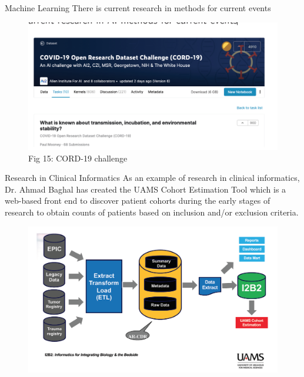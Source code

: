 \documentclass{beamer}
\begin{document}
	\begin{frame}{Machine Learning}
		There is current research in methods for current events
		\begin{figure}[h]
			\centering
			\includegraphics[scale=0.45]{Figures/covid.png}
			\caption{Fig 15: CORD-19 challenge}
		\end{figure}
	\end{frame}
	
	\begin{frame}{Research in Clinical Informatics}
		As an example of research in clinical informatics, Dr. Ahmad Baghal has
		created the UAMS Cohort Estimation Tool which is a web-based front end
		to discover patient cohorts during the early stages of research to obtain
		counts of patients based on inclusion and/or exclusion criteria.
		\begin{figure}[h]
			\centering
			\includegraphics[scale=0.45]{Figures/baghal.png}
		\end{figure}
	\end{frame}
	
\end{document}

